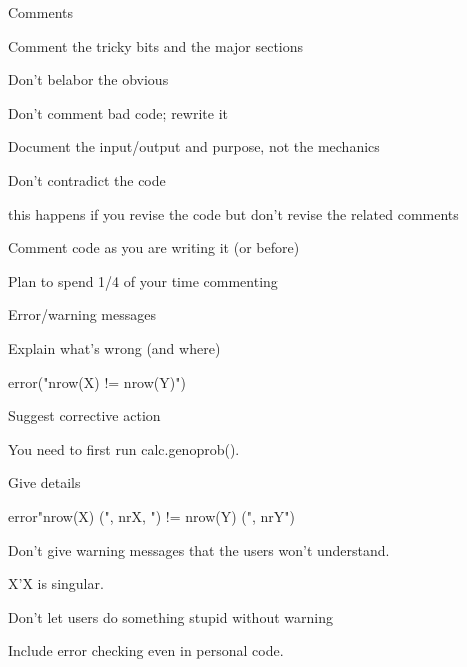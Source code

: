 \documentclass[12pt,t]{beamer}
\begin{document}
\begin{frame}{Comments}

\bbi
\item Comment the tricky bits and the major sections
\item Don't belabor the obvious
\item Don't comment bad code; rewrite it
\item Document the input/output and purpose, not the mechanics
\item Don't contradict the code
  \bi
  \item this happens if you revise the code but don't revise the
    related comments
  \ei
\item Comment code as you are writing it (or before)
\item Plan to spend 1/4 of your time commenting
\ei


\end{frame}




\begin{frame}{Error/warning messages}

\vspace{6pt}

{\small
\bi
\item Explain what's wrong (and where)
  \bi
  \item {\ttsm error("nrow(X) != nrow(Y)")}
  \ei

\item Suggest corrective action
  \bi
  \item {\ttsm You need to first run calc.genoprob().}
  \ei

\item Give details
  \bi
  \item {\ttfn error"nrow(X) (", nrX, ") != nrow(Y) (", nrY")}
  \ei


\item Don't give warning messages that the users won't understand.
  \bi
  \item {\ttsm X'X is singular.}
  \ei

\item Don't let users do something stupid without warning

\item Include error checking even in personal code.
\ei
}

\end{frame}
\end{document}
